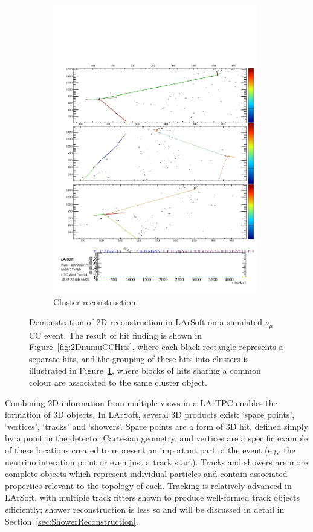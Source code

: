 \begin{figure}
\begin{subfigure}[t]{0.48\linewidth}
    \includegraphics[width=0.98\textwidth]{2DnumuCCClusters.pdf}
    \caption{Cluster reconstruction.}
    \label{fig:2DnumuCCClusters}
  \end{subfigure}
  \caption[Demonstration of 2D reconstruction in LArSoft on a simulated $\nu_{\mu}$CC event.]{Demonstration of 2D reconstruction in LArSoft on a simulated $\nu_{\mu}$CC event.  The result of hit finding is shown in Figure~\ref{fig:2DnumuCCHits}, where each black rectangle represents a separate hits, and the grouping of these hits into clusters is illustrated in Figure~\ref{fig:2DnumuCCClusters}, where blocks of hits sharing a common colour are associated to the same cluster object.}
  \label{fig:2DnumuCC}
\end{figure}

Combining 2D information from multiple views in a LArTPC enables the formation of 3D objects.  In LArSoft, several 3D products exist: `space points', `vertices', `tracks' and `showers'.  Space points are a form of 3D hit, defined simply by a point in the detector Cartesian geometry, and vertices are a specific example of these locations created to represent an important part of the event (e.g. the neutrino interation point or even just a track start).  Tracks and showers are more complete objects which represent individual particles and contain associated properties relevant to the topology of each.  Tracking is relatively advanced in LArSoft, with multiple track fitters shown to produce well-formed track objects efficiently; shower reconstruction is less so and will be discussed in detail in Section~\ref{sec:ShowerReconstruction}.

